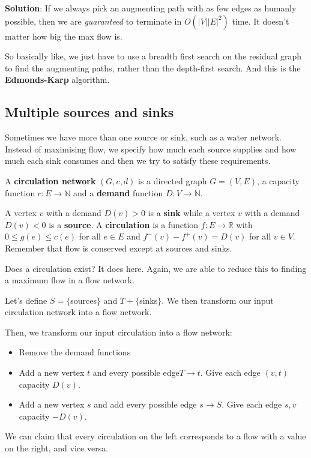 \documentclass[11pt,a4paper,titlepage,dvipsnames,cmyk]{scrartcl}
\begin{document}
\textbf{Solution}: If we always pick an augmenting path with as few edges
as humanly possible, then we are \textit{guaranteed} to terminate in
$O(|V||E|^2)$ time. It doesn't matter how big the max flow is.

So basically like, we just have to use a breadth first search on the
residual graph to find the augmenting paths, rather than the depth-first
search. And this is the \textbf{Edmonds-Karp} algorithm.

\subsection{Multiple sources and sinks}%
\label{sub:sources/sinks-multiple}
Sometimes we have more than one source or sink, such as a water network.
Instead of maximising flow, we specify how much each source supplies and
how much each sink consumes and then we try to satisfy these
requirements.

A \textbf{circulation network} $(G,c,d)$ is a directed graph $G = (V,E)$,
a capacity function $c:E \rightarrow \mathbb{N}$ and a \textbf{demand}
function $D:V \rightarrow \mathbb{N}$.

A vertex $v$ with a demand $D(v) > 0$ is a \textbf{sink} while a vertex
$v$ with a demand $D(v) < 0$ is a \textbf{source}. A \textbf{circulation}
is a function $f: E \rightarrow \mathbb{R}$ with $0 \le g(e) \le c(e)$ for
all $e \in E$ and $f^-(v) - f^+(v) = D(v)$ for all $v \in V$. Remember
that flow is conserved except at sources and sinks.

Does a circulation exist? It does here. Again, we are able to reduce this
to finding a maximum flow in a flow network.

Let's define $S = \{$sources$\}$ and $T + \{$sinks$\}$. We then transform
our input circulation network into a flow network.

Then, we transform our input circulation into a flow network:
\begin{itemize}
    \item Remove the demand functions
    \item Add a new vertex $t$ and every possible edge$T \rightarrow t$.
        Give each edge $(v,t)$ capacity $D(v)$.
    \item Add a new vertex $s$ and add every possible edge $s \rightarrow
        S$. Give each edge $s,v$ capacity $-D(v)$. 
\end{itemize}

We can claim that every circulation on the left corresponds to a flow with
a value on the right, and vice versa.
\end{document}
